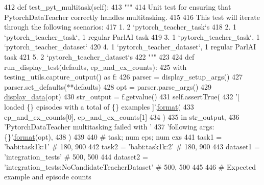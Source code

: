 \begin{DoxyCode}
412     \textcolor{keyword}{def }test\_pyt\_multitask(self):
413         \textcolor{stringliteral}{"""}
414 \textcolor{stringliteral}{        Unit test for ensuring that PytorchDataTeacher correctly handles multitasking.}
415 \textcolor{stringliteral}{}
416 \textcolor{stringliteral}{        This test will iterate through the following scenarios:}
417 \textcolor{stringliteral}{            1. 2 `pytorch\_teacher\_task`s}
418 \textcolor{stringliteral}{            2. 1 `pytorch\_teacher\_task`, 1 regular ParlAI task}
419 \textcolor{stringliteral}{            3. 1 `pytorch\_teacher\_task`, 1 `pytorch\_teacher\_dataset`}
420 \textcolor{stringliteral}{            4. 1 `pytorch\_teacher\_dataset`, 1 regular ParlAI task}
421 \textcolor{stringliteral}{            5. 2 `pytorch\_teacher\_dataset`s}
422 \textcolor{stringliteral}{        """}
423 
424         \textcolor{keyword}{def }run\_display\_test(defaults, ep\_and\_ex\_counts):
425             with testing\_utils.capture\_output() \textcolor{keyword}{as} f:
426                 parser = display\_setup\_args()
427                 parser.set\_defaults(**defaults)
428                 opt = parser.parse\_args()
429                 \hyperlink{namespacedisplay__data}{display\_data}(opt)
430             str\_output = f.getvalue()
431             self.assertTrue(
432                 \textcolor{stringliteral}{'[ loaded \{\} episodes with a total of \{\} examples ]'}.\hyperlink{namespaceparlai_1_1chat__service_1_1services_1_1messenger_1_1shared__utils_a32e2e2022b824fbaf80c747160b52a76}{format}(
433                     ep\_and\_ex\_counts[0], ep\_and\_ex\_counts[1]
434                 )
435                 \textcolor{keywordflow}{in} str\_output,
436                 \textcolor{stringliteral}{'PytorchDataTeacher multitasking failed with '}
437                 \textcolor{stringliteral}{'following args: \{\}'}.\hyperlink{namespaceparlai_1_1chat__service_1_1services_1_1messenger_1_1shared__utils_a32e2e2022b824fbaf80c747160b52a76}{format}(opt),
438             )
439 
440         \textcolor{comment}{# task; num eps; num exs}
441         task1 = \textcolor{stringliteral}{'babi:task1k:1'}  \textcolor{comment}{# 180, 900}
442         task2 = \textcolor{stringliteral}{'babi:task1k:2'}  \textcolor{comment}{# 180, 900}
443         dataset1 = \textcolor{stringliteral}{'integration\_tests'}  \textcolor{comment}{# 500, 500}
444         dataset2 = \textcolor{stringliteral}{'integration\_tests:NoCandidateTeacherDataset'}  \textcolor{comment}{# 500, 500}
445 
446         \textcolor{comment}{# Expected example and episode counts}

\end{DoxyCode}

